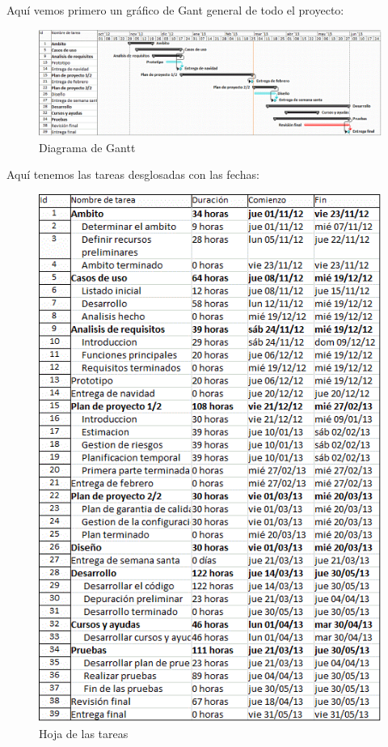 \documentclass[spanish,a4paper,12pt]{report}	%
\begin{document}
	Aquí vemos primero un gráfico de Gant general de todo el proyecto:

	\begin{figure}[!h]
	\centering
	\includegraphics[scale=0.57]{GraficoGantt.png}
	\caption{Diagrama de Gantt}
	\end{figure}

	\newpage

	Aquí tenemos las tareas desglosadas con las fechas:

	\begin{figure}[!h]
	\centering
	\includegraphics[scale=0.95]{HojaTareas.png}
	\caption{Hoja de las tareas}
	\end{figure}
\end{document}
